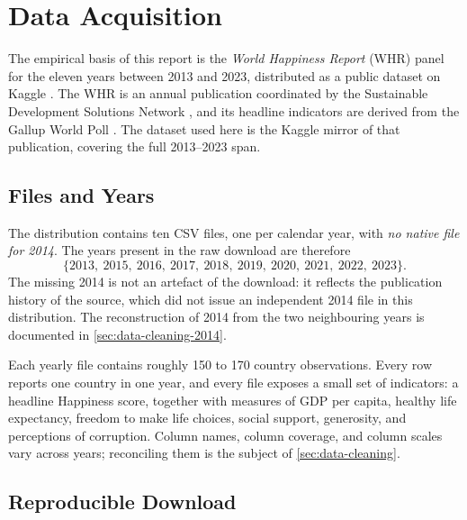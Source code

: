 
\section{Data Acquisition}
\label{sec:data-acquisition}

The empirical basis of this report is the \emph{World Happiness Report} (WHR) panel for the eleven years between 2013 and 2023, distributed as a public dataset on Kaggle \parencite{kaggle_whr}. The WHR is an annual publication coordinated by the Sustainable Development Solutions Network \parencite{helliwell2013,helliwell2023}, and its headline indicators are derived from the Gallup World Poll \parencite{gallup_world_poll}. The dataset used here is the Kaggle mirror of that publication, covering the full 2013--2023 span.

\subsection{Files and Years}

The distribution contains ten CSV files, one per calendar year, with \emph{no native file for 2014}. The years present in the raw download are therefore
\[
\{2013,\ 2015,\ 2016,\ 2017,\ 2018,\ 2019,\ 2020,\ 2021,\ 2022,\ 2023\}.
\]
The missing 2014 is not an artefact of the download: it reflects the publication history of the source, which did not issue an independent 2014 file in this distribution. The reconstruction of 2014 from the two neighbouring years is documented in \cref{sec:data-cleaning-2014}.

Each yearly file contains roughly 150 to 170 country observations. Every row reports one country in one year, and every file exposes a small set of indicators: a headline Happiness score, together with measures of GDP per capita, healthy life expectancy, freedom to make life choices, social support, generosity, and perceptions of corruption. Column names, column coverage, and column scales vary across years; reconciling them is the subject of \cref{sec:data-cleaning}.

\subsection{Reproducible Download}
\label{sec:data-acquisition-download}


